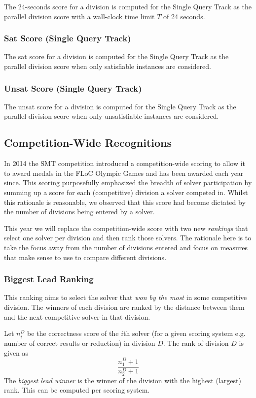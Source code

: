 \documentclass[12pt]{article}
\newcommand{\maintrack}{Single Query Track\xspace}
\begin{document}
The 24-seconds score for a division is computed for the \maintrack as the
parallel division score with a wall-clock time limit $T$ of 24 seconds.

\subsubsection{Sat Score (\maintrack)}

The sat score for a division is computed for the \maintrack as the
parallel division score when only satisfiable instances are considered.

\subsubsection{Unsat Score (\maintrack)}
The unsat score for a division is computed for the \maintrack as the
parallel division score when only unsatisfiable instances are considered.


\subsection{Competition-Wide Recognitions}

In 2014 the SMT competition introduced a competition-wide scoring to allow it to award medals in the FLoC Olympic Games and has been awarded each year since. This scoring purposefully emphasized the breadth of solver participation by summing up a score for each (competitive) division a solver competed in. Whilst this rationale is reasonable, we observed that this score had become dictated by the number of divisions being entered by a solver.

This year we will replace the competition-wide score with two new \emph{rankings} that select one solver per division and then rank those solvers. The rationale here is to take the focus away from the number of divisions entered and focus on measures that make sense to use to compare different divisions.

\subsubsection{Biggest Lead Ranking}

This ranking aims to select the solver that \emph{won by the most} in some competitive division. The winners of each division are ranked by the distance between them and the next competitive solver in that division.

Let $n_i^D$ be the correctness score of the $i$th solver (for a given scoring system e.g. number of correct results or reduction) in division $D$. The rank of division $D$ is given as
\[
\frac{n_1^D+1}{n_2^D+1}
\]
The \emph{biggest lead winner} is the winner of the division with the highest (largest) rank. This can be computed per scoring system.
\end{document}
